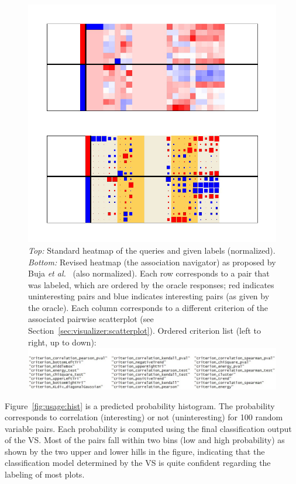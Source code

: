 \begin{figure}[H]
	\begin{center}
		\includegraphics[width=0.8\linewidth]
		{ch-usage/figures/heatmaps}
		\caption[Normalized heatmap of the queries and given labels.] 
		{\textit{Top:} Standard heatmap of the queries and given labels 
		(normalized). 
		\textit{Bottom:} Revised heatmap (the association navigator) as 
		proposed by Buja \textit{et al.}~\cite{buja2016} (also normalized). 
		Each row corresponds to a pair that was labeled, which are ordered by 
		the oracle responses; red indicates uninteresting pairs and blue 
		indicates interesting pairs (as given by the oracle). Each column 
		corresponds to a different criterion of the associated pairwise 
		scatterplot (see Section~\ref{sec:visualizer:scatterplot}). Ordered 
		criterion list (left to right, up to down): 
		\includegraphics[width=1\linewidth]{ch-usage/figures/criterionlist}}
		\label{fig:usage:heatmaps}
	\end{center}
\end{figure}

Figure~\ref{fig:usage:hist} is a predicted probability histogram. The 
probability corresponds to correlation (interesting) or not (uninteresting) for 
100 random variable pairs. Each probability is computed using the final 
classification output of the VS. Most of the pairs fall within two bins (low 
and high probability) as shown by the two upper and lower hills in the figure, 
indicating that the classification model determined by the VS is quite 
confident regarding the labeling of most plots.

